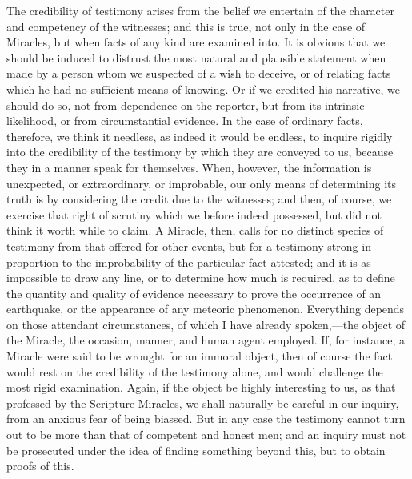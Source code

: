 The credibility of testimony arises from the
belief we entertain of the character and competency of the witnesses;
and this is true, not only in the case of Miracles, but when facts of
any kind are examined into. It is obvious that we should be induced to
distrust the most natural and plausible statement when made by a
person whom we suspected of a wish to deceive, or of relating facts
which he had no sufficient means of knowing. Or if we credited his
narrative, we should do so, not from dependence on the reporter, but
from its intrinsic likelihood, or from circumstantial evidence. In the
case of ordinary facts, therefore, we think it needless, as indeed it
would be endless, to inquire rigidly into the credibility of the testimony by which they are conveyed to us, because they in a manner
speak for themselves. When, however, the information is unexpected, or
extraordinary, or improbable, our only means of determining its truth
is by considering the credit due to the witnesses; and then, of
course, we exercise that right of scrutiny which we before indeed
possessed, but did not think it worth while to claim. A Miracle, then,
calls for no distinct species of testimony from that offered for other
events, but for a testimony strong in proportion to the improbability
of the particular fact attested; and it is as impossible to draw any
line, or to determine how much is required, as to define the quantity
and quality of evidence necessary to prove the occurrence of an
earthquake, or the appearance of any meteoric phenomenon. Everything
depends on those attendant circumstances, of which I have already
spoken,—the object of the Miracle, the occasion, manner, and human
agent employed. If, for instance, a Miracle were said to be wrought
for an immoral object, then of course the fact would rest on the
credibility of the testimony alone, and would challenge the most rigid
examination. Again, if the object be highly interesting to us, as that
professed by the Scripture Miracles, we shall naturally be careful in
our inquiry, from an anxious fear of being biassed. But in any case
the testimony cannot turn out to be more than that of competent and
honest men; and an inquiry must not be prosecuted under the idea
of finding something beyond this, but to obtain proofs of this.

